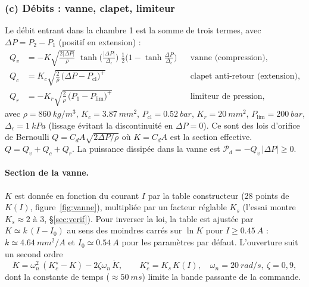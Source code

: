 \documentclass[11pt,a4paper]{article}
\newcommand{\dt}[1]{\dot{#1}}
\newcommand{\ddt}[1]{\ddot{#1}}
\begin{document}
\subsubsection*{(c) Débits : vanne, clapet, limiteur}
Le débit entrant dans la chambre 1 est la somme de trois termes, avec $\Delta P=P_2-P_1$ (positif en extension) :
\begin{align}
 Q_v&=-K\sqrt{\tfrac{2|\Delta P|}{\rho}}\;\tanh\!\Big(\tfrac{|\Delta P|}{\Delta_\epsilon}\Big)\;\tfrac12\Big(1-\tanh\tfrac{\Delta P}{\Delta_\epsilon}\Big)&&\text{vanne (compression)},\\
 Q_c&=K_c\sqrt{\tfrac{2}{\rho}\,\big(\Delta P-P_{\text{cl}}\big)^{+}}&&\text{clapet anti-retour (extension)},\\
 Q_r&=-K_r\sqrt{\tfrac{2}{\rho}\,\big(P_1-P_{\lim}\big)^{+}}&&\text{limiteur de pression},
\end{align}
avec $\rho=\SI{860}{kg/m^3}$, $K_c=\SI{3,87}{mm^2}$, $P_{\text{cl}}=\SI{0,52}{bar}$, $K_r=\SI{20}{mm^2}$, $P_{\lim}=\SI{200}{bar}$, $\Delta_\epsilon=\SI{1}{kPa}$ (lissage évitant la discontinuité en $\Delta P=0$). Ce sont des lois d'orifice de Bernoulli $Q=C_dA\sqrt{2\Delta P/\rho}$ où $K=C_dA$ est la section effective. $Q=Q_v+Q_c+Q_r$. La puissance dissipée dans la vanne est $\mathcal P_d=-Q_v\,|\Delta P|\ge0$.

\paragraph{Section de la vanne.} $K$ est donnée en fonction du courant $I$ par la table constructeur (28 points de $K(I)$, figure~\ref{fig:vanne}), multipliée par un facteur réglable $K_s$ (l'essai montre $K_s\approx2$ à $3$, §\ref{sec:verif}). Pour inverser la loi, la table est ajustée par $K\simeq k\,(I-I_0)$ au sens des moindres carrés sur $\ln K$ pour $I\ge\SI{0,45}{A}$ : $k\simeq\SI{4,64}{mm^2/A}$ et $I_0\simeq\SI{0,54}{A}$ pour les paramètres par défaut. L'ouverture suit un second ordre
\begin{equation}
 \ddt K=\omega_n^2\,(K_c^\star-K)-2\zeta\omega_n\,\dt K,\qquad K_c^\star=K_s\,K(I),\quad \omega_n=\SI{20}{rad/s},\ \zeta=0{,}9,
\end{equation}
dont la constante de temps ($\approx\SI{50}{ms}$) limite la bande passante de la commande.
\end{document}
